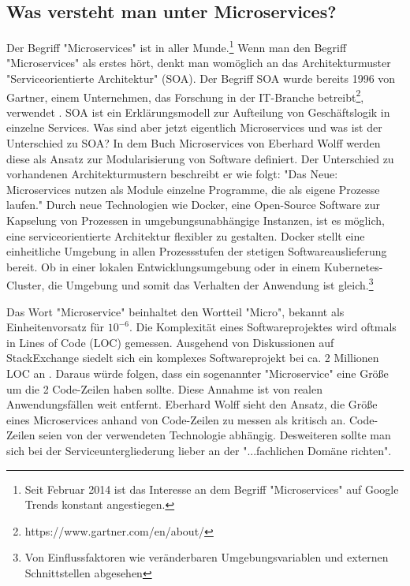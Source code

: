\subsection{Was versteht man unter Microservices?}
\label{subsec:wasverstehtmanuntermicroservices}
Der Begriff "Microservices" ist in aller Munde.\footnote{Seit Februar 2014 ist das Interesse
an dem Begriff "Microservices" auf Google Trends konstant angestiegen.\cite{MicroservicesGoogleTrends}}
Wenn man den Begriff "Microservices" als erstes hört, denkt man womöglich an das Architekturmuster
"Serviceorientierte Architektur" (SOA). Der Begriff SOA wurde bereits 1996
von Gartner, einem Unternehmen, das Forschung in der IT-Branche
betreibt\footnote{https://www.gartner.com/en/about/}, verwendet \cite{GartnerSOAPart1}.
SOA ist ein Erklärungsmodell zur Aufteilung von Geschäftslogik in einzelne Services.
Was sind aber jetzt eigentlich Microservices und was ist der Unterschied zu SOA?
In dem Buch Microservices von Eberhard Wolff werden diese als Ansatz zur Modularisierung
von Software definiert. Der Unterschied zu vorhandenen Architekturmustern beschreibt er wie folgt:
"Das Neue: Microservices nutzen als Module einzelne
Programme, die als eigene Prozesse laufen."\cite[S. 2]{MicroservicesBook}
Durch neue Technologien wie Docker, eine Open-Source Software
zur Kapselung von Prozessen in umgebungsunabhängige Instanzen, \cite{DockerOverview}
ist es möglich, eine serviceorientierte Architektur flexibler
zu gestalten. Docker stellt eine einheitliche Umgebung in
allen Prozessstufen der stetigen Softwareauslieferung bereit.
Ob in einer lokalen Entwicklungsumgebung oder in einem
Kubernetes-Cluster, die Umgebung und somit das
Verhalten der Anwendung ist gleich.\footnote{Von Einflussfaktoren
wie veränderbaren Umgebungsvariablen und externen Schnittstellen abgesehen}

Das Wort "Microservice" beinhaltet den Wortteil "Micro",
bekannt als Einheitenvorsatz für \(10^{-6}\). Die Komplexität eines Softwareprojektes
wird oftmals in Lines of Code (LOC) gemessen. Ausgehend
von Diskussionen auf StackExchange siedelt sich ein komplexes Softwareprojekt bei
ca. 2 Millionen LOC an \cite{ProjectsizeStackexchange}.
Daraus würde folgen, dass ein sogenannter "Microservice" eine Größe um die
2 Code-Zeilen haben sollte. Diese Annahme ist von realen
Anwendungsfällen weit entfernt. Eberhard Wolff sieht den Ansatz,
die Größe eines Microservices anhand von Code-Zeilen zu
messen als kritisch an. Code-Zeilen seien von der verwendeten
Technologie abhängig. Desweiteren sollte man sich bei der
Serviceuntergliederung lieber an der "...fachlichen Domäne richten".\cite[S. 31 und 32]{MicroservicesBook}

